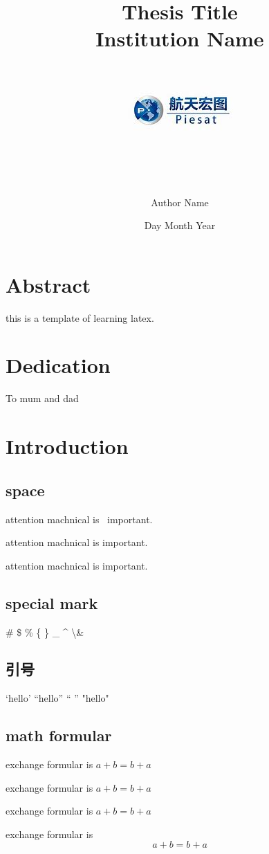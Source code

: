 \documentclass[12pt]{report}
\title{
    {Thesis Title}\\
    {\large Institution Name}\\
    {\includegraphics{piesat.jpg}}
}
\author{Author Name}
\date{Day Month Year}
\begin{document}
\maketitle

\chapter*{Abstract}
this is a template of learning latex.

\chapter*{Dedication}
To mum and dad

\tableofcontents
\listoffigures
\listoftables

\chapter{Introduction}
\section{space}
attention machnical is \  important.\par
attention machnical is \quad important.\par %
attention machnical is \hfill  important.\par   %

\section{special mark}
\# \$ \% \{ \} \_{} \^{} \textbackslash \&

\section{引号}
`hello' ``hello'' ``  '' "hello"

\section{math formular}
exchange formular is $a+b=b+a$ \par
exchange formular is \begin{math}
    a+b=b+a
\end{math} \par
exchange formular is \(a+b=b+a\) \par
exchange formular is 
\begin{equation}
    a+b=b+a \label{eq:1}
\end{equation}
\end{document}
